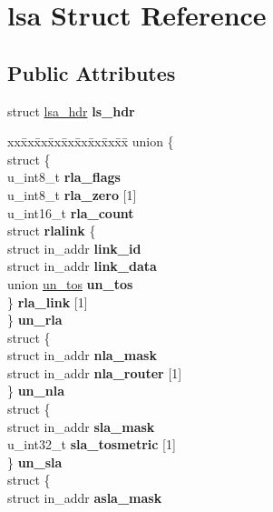 \hypertarget{structlsa}{
\section{lsa Struct Reference}
\label{structlsa}
}
\subsection*{Public Attributes}
\begin{DoxyCompactItemize}
\item 
\hypertarget{structlsa_afda1c88a5404724d79d770917763b068}{
struct \hyperlink{structlsa__hdr}{lsa\_\-hdr} {\bfseries ls\_\-hdr}}
\label{structlsa_afda1c88a5404724d79d770917763b068}

\item 
\hypertarget{structlsa_a14d7b09626eda9346d5b6a946cd789b7}{
\begin{tabbing}
xx\=xx\=xx\=xx\=xx\=xx\=xx\=xx\=xx\=\kill
union \{\\
\>struct \{\\
\>\>u\_int8\_t {\bfseries rla\_flags}\\
\>\>u\_int8\_t {\bfseries rla\_zero} \mbox{[}1\mbox{]}\\
\>\>u\_int16\_t {\bfseries rla\_count}\\
\>\>struct {\bfseries rlalink} \{\\
\>\>\>struct in\_addr {\bfseries link\_id}\\
\>\>\>struct in\_addr {\bfseries link\_data}\\
\>\>\>union \hyperlink{unionun__tos}{un\_tos} {\bfseries un\_tos}\\
\>\>\} {\bfseries rla\_link} \mbox{[}1\mbox{]}\\
\>\} {\bfseries un\_rla}\\
\>struct \{\\
\>\>struct in\_addr {\bfseries nla\_mask}\\
\>\>struct in\_addr {\bfseries nla\_router} \mbox{[}1\mbox{]}\\
\>\} {\bfseries un\_nla}\\
\>struct \{\\
\>\>struct in\_addr {\bfseries sla\_mask}\\
\>\>u\_int32\_t {\bfseries sla\_tosmetric} \mbox{[}1\mbox{]}\\
\>\} {\bfseries un\_sla}\\
\>struct \{\\
\>\>struct in\_addr {\bfseries asla\_mask}\\

\end{tabbing}}
\end{DoxyCompactItemize}
